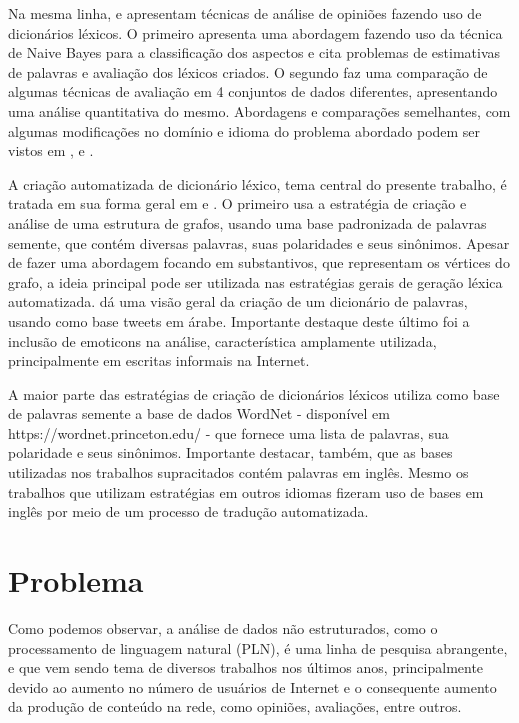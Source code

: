 \documentclass[a4paper,11pt]{article}
\begin{document}
Na mesma linha, \cite{eisenstein2016unsupervised} e \cite{bandhakavi2016lexicon} apresentam técnicas de análise de opiniões fazendo uso de dicionários léxicos. O primeiro apresenta uma abordagem fazendo uso da técnica de Naive Bayes para a classificação dos aspectos e cita problemas de estimativas de palavras e avaliação dos léxicos criados. O segundo faz uma comparação de algumas técnicas de avaliação em 4 conjuntos de dados diferentes, apresentando uma análise quantitativa do mesmo. Abordagens e comparações semelhantes, com algumas modificações no domínio e idioma do problema abordado podem ser vistos em \cite{khoo2017lexicon}, \cite{asghar2014review} e \cite{ding2008holistic}.

A criação automatizada de dicionário léxico, tema central do presente trabalho, é tratada em sua forma geral em \cite{widdows2002graph} e \cite{duwairi2015detecting}. O primeiro usa a estratégia de criação e análise de uma estrutura de grafos, usando uma base padronizada de palavras semente, que contém diversas palavras, suas polaridades e seus sinônimos. Apesar de fazer uma abordagem focando em substantivos, que representam os vértices do grafo, a ideia principal pode ser utilizada nas estratégias gerais de geração léxica automatizada. \cite{duwairi2015detecting} dá uma visão geral da criação de um dicionário de palavras, usando como base tweets em árabe. Importante destaque deste último foi a inclusão de emoticons na análise, característica amplamente utilizada, principalmente em escritas informais na Internet.

A maior parte das estratégias de criação de dicionários léxicos utiliza como base de palavras semente a base de dados WordNet - disponível em https://wordnet.princeton.edu/ - que fornece uma lista de palavras, sua polaridade e seus sinônimos. Importante destacar, também, que as bases utilizadas nos trabalhos supracitados contém palavras em inglês. Mesmo os trabalhos que utilizam estratégias em outros idiomas fizeram uso de bases em inglês por meio de um processo de tradução automatizada.

\section{Problema}
Como podemos observar, a análise de dados não estruturados, como o processamento de linguagem natural (PLN), é uma linha de pesquisa abrangente, e que vem sendo tema de diversos trabalhos nos últimos anos, principalmente devido ao aumento no número de usuários de Internet e o consequente aumento da produção de conteúdo na rede, como opiniões, avaliações, entre outros. 
\end{document}
